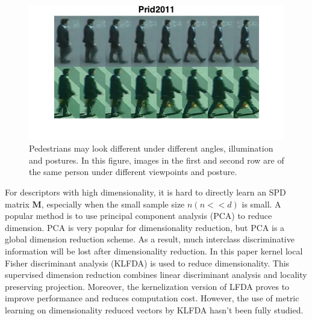 \documentclass[10pt,twocolumn,letterpaper]{article}
\begin{document}
\begin{figure} 
\centering
\includegraphics[width=1\linewidth]{DisimilarIntra.jpg}
\vspace{-2em}
\caption{Pedestrians may look different under different angles, illumination and postures. In this figure, images in the first and second row are of the same person under different viewpoints and posture.}
\label{DisimilarIntra}
\end{figure}
\indent For descriptors with high dimensionality, it is hard to directly learn an SPD matrix $\bm{M}$, especially when the small sample size $n (n<<d)$ is small. A popular method is to use principal component analysis (PCA) to reduce dimension. PCA is very popular for dimensionality reduction, but PCA is a global dimension reduction scheme. As a result, much interclass discriminative information will be lost after dimensionality reduction. In this paper kernel local Fisher discriminant analysis (KLFDA) \cite{KernelVersionMetrics} is used to reduce dimensionality. This supervised dimension reduction combines linear discriminant analysis and locality preserving projection. Moreover, the kernelization version of LFDA proves to improve performance and reduces computation cost. However, the use of metric learning on dimensionality reduced vectors by KLFDA hasn't been fully studied.\\
\end{document}
